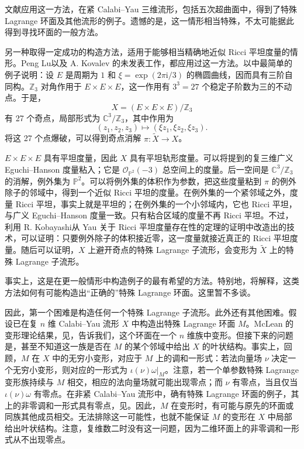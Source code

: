 文献应用这一方法，在紧 Calabi--Yau 三维流形，包括五次超曲面中，得到了特殊 Lagrange 环面及其他流形的例子。遗憾的是，这一情形相当特殊，不太可能据此得到寻找环面的一般方法。

另一种取得一定成功的构造方法，适用于能够相当精确地近似 Ricci 平坦度量的情形。Peng Lu以及 A. Kovalev 的未发表工作，都应用过这一方法。以中最简单的例子说明：设 $E$ 是周期为 $1$ 和 $\xi=\exp(2\pi\mathrm i/3)$ 的椭圆曲线，因而具有三阶自同构。$\mathbb Z_3$ 对角作用于 $E\times E\times E$，这一作用有 $3^3=27$ 个稳定子阶数为三的不动点。于是，
\[
X=(E\times E\times E)/\mathbb Z_3
\]
有 27 个奇点，局部形式为 $\mathbb C^3/\mathbb Z_3$，其中作用为
\[
(z_1,z_2,z_3)\longmapsto(\xi z_1,\xi z_2,\xi z_3).
\]
将这 27 个点爆破，可以得到奇点消解 $\pi\colon\widetilde X\to X$。

$E\times E\times E$ 具有平坦度量，因此 $X$ 具有平坦轨形度量。可以将提到的复三维广义 Eguchi--Hanson 度量粘入；它是 $\mathcal O_{\mathbb P^2}(-3)$ 总空间上的度量。后一空间是 $\mathbb C^3/\mathbb Z_3$ 的消解，例外集为 $\mathbb P^2$。可以将例外集的体积作为参数，把这些度量粘到 $\pi$ 的例外除子的邻域中，得到一个近似 Ricci 平坦的度量。在例外集的一个紧邻域之外，度量 Ricci 平坦，事实上就是平坦的；在例外集的一个小邻域内，它也 Ricci 平坦，与广义 Eguchi--Hanson 度量一致。只有粘合区域的度量不再 Ricci 平坦。不过，利用 R. Kobayashi从 Yau 关于 Ricci 平坦度量存在性的定理的证明中改造出的技术，可以证明：只要例外除子的体积接近零，这一度量就接近真正的 Ricci 平坦度量。随后可以证明，$X$ 上避开奇点的特殊 Lagrange 子流形，会变形为 $\widetilde X$ 上的特殊 Lagrange 子流形。

事实上，这是在更一般情形中构造例子的最有希望的方法。特别地，将解释，这类方法如何有可能构造出“正确的”特殊 Lagrange 环面。这里暂不多谈。

因此，第一个困难是构造任何一个特殊 Lagrange 子流形。此外还有其他困难。假设已在复 $n$ 维 Calabi--Yau 流形 $X$ 中构造出特殊 Lagrange 环面 $M$。McLean 的变形理论结果，见，告诉我们，这个环面在一个 $n$ 维族中变形。但接下来的问题是，甚至不知道这一族是否在 $M$ 的某个邻域中给出 $X$ 的叶状结构。事实上，回顾，$M$ 在 $X$ 中的无穷小变形，对应于 $M$ 上的调和一形式：若法向量场 $\nu$ 决定一个无穷小变形，则对应的一形式为 $\iota(\nu)\omega|_M$。注意，若一个单参数特殊 Lagrange 变形族持续与 $M$ 相交，相应的法向量场就可能出现零点；而 $\nu$ 有零点，当且仅当 $\iota(\nu)\omega$ 有零点。在非紧 Calabi--Yau 流形中，确有特殊 Lagrange 环面的例子，其上的非零调和一形式具有零点，见。因此，$M$ 在变形时，有可能与原先的环面或同族其他成员相交。无法排除这一可能性，也就不能保证 $M$ 的变形在 $X$ 中局部给出叶状结构。注意，复维数二时没有这一问题，因为二维环面上的非零调和一形式从不出现零点。


